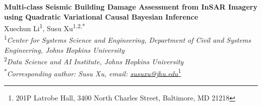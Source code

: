 \documentclass[review]{elsarticle}
\date{} %
\begin{document}
\begin{flushleft}
    \Large \textbf{Multi-class Seismic Building Damage Assessment from InSAR Imagery using Quadratic Variational Causal Bayesian Inference} \\
    \vspace{0.5cm}
    \normalsize
    Xuechun Li\textsuperscript{1}, Susu Xu\textsuperscript{1,2,*}\\
    \vspace{0.3cm}
    \textsuperscript{1}\textit{Center for Systems Science and Engineering, Department of Civil and Systems Engineering, Johns Hopkins University}\\
    \textsuperscript{2}\textit{Data Science and AI Institute, Johns Hopkins University}\\
    \textsuperscript{*}\textit{Corresponding author: Susu Xu, email: \url{susuxu@jhu.edu}}\footnote{201P Latrobe Hall, 3400 North Charles Street, Baltimore, MD 21218}
\end{flushleft}

\noindent 
\end{document}
